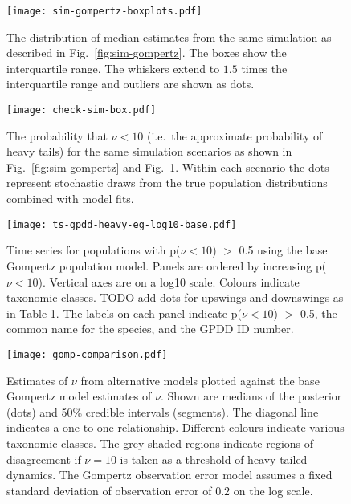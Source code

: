 \begin{figure}[htbp]
\begin{center}
\texttt{[image: sim-gompertz-boxplots.pdf]}
\caption{The distribution of median estimates from the same simulation as described in Fig.~\ref{fig:sim-gompertz}. The boxes show the interquartile range. The whiskers extend to $1.5$ times the interquartile range and outliers are shown as dots.}
\label{fig:sim-gompertz-boxplots}
\end{center}
\end{figure}


\begin{figure}[htbp]
\begin{center}
\texttt{[image: check-sim-box.pdf]}
\caption{The probability that $\nu < 10$ (i.e.\ the approximate probability of heavy tails) for the same simulation scenarios as shown in Fig.~\ref{fig:sim-gompertz} and Fig.~\ref{fig:sim-gompertz-boxplots}. Within each scenario the dots represent stochastic draws from the true population distributions combined with model fits.}
\label{fig:sim-prob}
\end{center}
\end{figure}


\begin{figure}[htbp]
\begin{center}
\texttt{[image: ts-gpdd-heavy-eg-log10-base.pdf]}
\caption{Time series for populations with p($\nu < 10$) $>$ 0.5 using the base Gompertz population model. Panels are ordered by increasing p($\nu < 10$). Vertical axes are on a log10 scale. Colours indicate taxonomic classes. TODO add dots for upswings and downswings as in Table 1. The labels on each panel indicate p($\nu < 10$) $>$ 0.5, the common name for the species, and the GPDD ID number.}
\label{fig:heavy-ts}
\end{center}
\end{figure}

\clearpage

\begin{figure}[htbp]
\begin{center}
\texttt{[image: gomp-comparison.pdf]}
\caption{Estimates of $\nu$ from alternative models plotted against the base Gompertz model estimates of $\nu$. Shown are medians of the posterior (dots) and 50\% credible intervals (segments). The diagonal line indicates a one-to-one relationship. Different colours indicate various taxonomic classes. The grey-shaded regions indicate regions of disagreement if $\nu = 10$ is taken as a threshold of heavy-tailed dynamics. The Gompertz observation error model assumes a fixed standard deviation of observation error of $0.2$ on the log scale.}
\label{fig:alt}
\end{center}
\end{figure}

